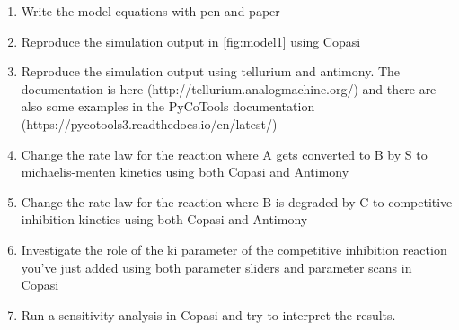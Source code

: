 \documentclass[11pt]{article}
\begin{document}
    \begin{enumerate}
        \item Write the model equations with pen and paper
        \item Reproduce the simulation output in \cref{fig:model1} using Copasi
        \item Reproduce the simulation output using tellurium and antimony. The documentation is here (http://tellurium.analogmachine.org/) and there are also some examples in the PyCoTools documentation (https://pycotools3.readthedocs.io/en/latest/)
        \item Change the rate law for the reaction where A gets converted to B by S to michaelis-menten kinetics using both Copasi and Antimony
        \item Change the rate law for the reaction where B is degraded by C to competitive inhibition kinetics using both Copasi and Antimony
        \item Investigate the role of the ki parameter of the competitive inhibition reaction you've just added using both parameter sliders and parameter scans in Copasi
        \item Run a sensitivity analysis in Copasi and try to interpret the results.
    \end{enumerate}

\end{document}
